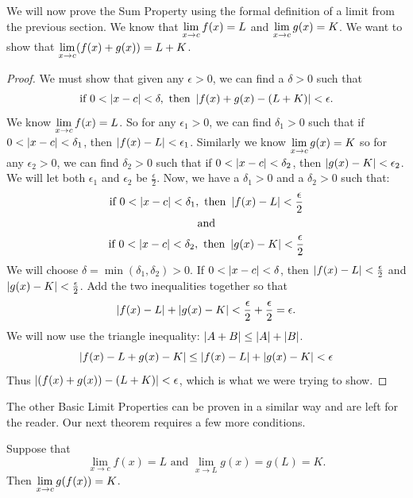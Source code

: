 We will now prove the Sum Property using the formal definition of a limit from the previous section. We know that $\displaystyle \lim_{x\to c}f(x) = L$ and  $\displaystyle\lim_{x\to c} g(x) = K$. We want to show that $\displaystyle \lim_{x\to c}(f(x)+g(x))=L+K$.

\begin{proof}
We must show that given any $\epsilon>0$, we can find a $\delta>0$ such that
\[\text{if }0<\left\lvert x-c \right\rvert<\delta,\text{ then }\left\lvert f(x)+g(x)-(L+K) \right\rvert<\epsilon.\]
We know $\displaystyle \lim_{x\to c}f(x) = L$. So for any $\epsilon_1 >0$, we can find $\delta_1>0$ such that if $0<\left\lvert x-c \right\rvert<\delta_1$, then $\left\lvert f(x)-L \right\rvert<\epsilon_1$. Similarly we know $\displaystyle\lim_{x\to c} g(x) = K$ so for any $\epsilon_2>0$, we can find $\delta_2>0$ such that if  $0<\left\lvert x-c \right\rvert<\delta_2$, then $\left\lvert g(x)-K \right\rvert<\epsilon_2$. We will let both $\epsilon_1$ and $\epsilon_2$ be $\frac{\epsilon}{2}$. Now, we have a $\delta_1>0$ and a $\delta_2>0$ such that:
\begin{gather*}
\text{if }0<\left\lvert x-c \right\rvert<\delta_1,\text{ then }\left\lvert f(x)-L \right\rvert<\frac{\epsilon}{2} \\
\text{and} \\
\text{if }0<\left\lvert x-c \right\rvert<\delta_2,\text{ then }\left\lvert g(x)-K \right\rvert<\frac{\epsilon}{2}
\end{gather*}
We will choose $\delta=\min(\delta_1,\delta_2)>0$. If $0<\left\lvert x-c \right\rvert<\delta$, then $\left\lvert f(x)-L \right\rvert<\frac{\epsilon}{2}$ and  $\left\lvert g(x)-K \right\rvert<\frac{\epsilon}{2}$.  Add the two inequalities together so that
\[\left\lvert f(x)-L \right\rvert+\left\lvert g(x)-K \right\rvert<\frac{\epsilon}{2}+\frac{\epsilon}{2}=\epsilon.\]
We will now use the triangle inequality: $\left\lvert A+B \right\rvert\leq\left\lvert A \right\rvert+\left\lvert B \right\rvert$.
\[\left\lvert f(x)-L+g(x)-K \right\rvert\leq\left\lvert f(x)-L \right\rvert+\left\lvert g(x)-K \right\rvert<\epsilon\]
Thus $\left\lvert (f(x)+g(x))-(L+K) \right\rvert<\epsilon$, which is what we were trying to show.
\end{proof}

The other Basic Limit Properties can be proven in a similar way and are left for the reader.  Our next theorem requires a few more conditions.

\begin{theorem}\label{thm:limit_composition}%
Suppose that\vspace{-.3\baselineskip}
\[\lim_{x\to c}f(x)=L\text{ and }\lim_{x\to L}g(x)=g(L)=K.\]
Then $\displaystyle\lim_{x\to c}g(f(x))=K$.
\end{theorem}


